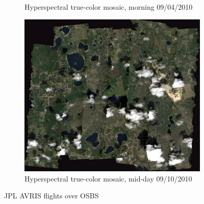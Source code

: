 \documentclass[remotesensing,article,accept,moreauthors,pdftex,12pt,a4paper]{mdpi}
\begin{document}
\begin{figure}[t]
\begin{subfigure}[b]{0.3\textwidth}
        \caption{Hyperspectral true-color mosaic, morning 09/04/2010}
        \label{fig:JPL_AVIRIS_true_color_mosaic_OSBS_9_4_10}
    \end{subfigure}
    \hfill
    \begin{subfigure}[b]{0.3\textwidth}
        \centering
        \includegraphics[width=\textwidth]{./images/JPL_AVIRIS_true_color_mosaic_OSBS_9_10_10.png}
        \caption{Hyperspectral true-color mosaic, mid-day 09/10/2010}
        \label{fig:JPL_AVIRIS_true_color_mosaic_OSBS_9_10_10}
    \end{subfigure}
    \caption{JPL AVRIS flights over OSBS \cite{neon2010aop}}
    \label{fig:hyperspectral}
\end{figure}
\end{document}

